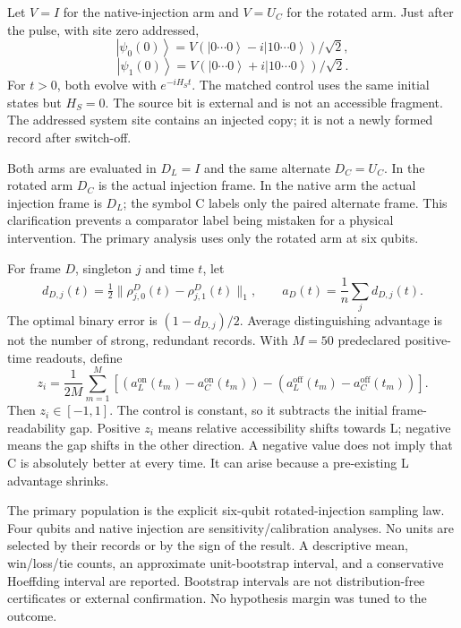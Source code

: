 \documentclass[
  10pt,
  a4paper,
]{article}
\makeatletter
\renewcommand\subsection{\@startsection{subsection}{2}{\z@}{-2ex \@plus -.8ex \@minus -.2ex}{.9ex \@plus .2ex}{\normalfont\large\bfseries}}
\makeatother
\begin{document}
Let \(V=I\) for the native-injection arm and \(V=U_C\) for the rotated
arm. Just after the pulse, with site zero addressed,
\[\left| \psi_0(0)\right\rangle=V( \left|0\cdots0\right\rangle-i\left|10\cdots0\right\rangle)/\sqrt2,\]
\[\left| \psi_1(0)\right\rangle=V( \left|0\cdots0\right\rangle+i\left|10\cdots0\right\rangle)/\sqrt2.\]
For \(t>0\), both evolve with \(e^{-iH_St}\). The matched control uses
the same initial states but \(H_S=0\). The source bit is external and is
not an accessible fragment. The addressed system site contains an
injected copy; it is not a newly formed record after switch-off.

Both arms are evaluated in \(D_L=I\) and the same alternate \(D_C=U_C\).
In the rotated arm \(D_C\) is the actual injection frame. In the native
arm the actual injection frame is \(D_L\); the symbol C labels only the
paired alternate frame. This clarification prevents a comparator label
being mistaken for a physical intervention. The primary analysis uses
only the rotated arm at six qubits.

\subsection{3. Primary estimand and
baseline}\label{primary-estimand-and-baseline}

For frame \(D\), singleton \(j\) and time \(t\), let
\[d_{D,j}(t)=\tfrac12\|\rho^D_{j,0}(t)-\rho^D_{j,1}(t)\|_1,\qquad a_D(t)=\frac1n\sum_j d_{D,j}(t).\]
The optimal binary error is \((1-d_{D,j})/2\). Average distinguishing
advantage is not the number of strong, redundant records. With \(M=50\)
predeclared positive-time readouts, define
\[z_i=\frac{1}{2M}\sum_{m=1}^{M}\left[(a_L^{\mathrm{on}}(t_m)-a_C^{\mathrm{on}}(t_m))-(a_L^{\mathrm{off}}(t_m)-a_C^{\mathrm{off}}(t_m))\right].\]
Then \(z_i\in[-1,1]\). The control is constant, so it subtracts the
initial frame-readability gap. Positive \(z_i\) means relative
accessibility shifts towards L; negative means the gap shifts in the
other direction. A negative value does not imply that C is absolutely
better at every time. It can arise because a pre-existing L advantage
shrinks.

The primary population is the explicit six-qubit rotated-injection
sampling law. Four qubits and native injection are
sensitivity/calibration analyses. No units are selected by their records
or by the sign of the result. A descriptive mean, win/loss/tie counts,
an approximate unit-bootstrap interval, and a conservative Hoeffding
interval are reported. Bootstrap intervals are not distribution-free
certificates or external confirmation. No hypothesis margin was tuned to
the outcome.
\end{document}
